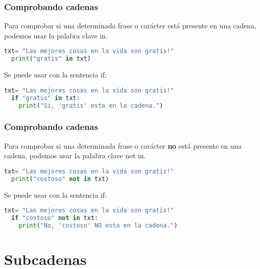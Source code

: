 \begin{frame}[fragile]
  \frametitle{Comprobando cadenas}

  Para comprobar si una determinada frase o carácter está presente
  en una cadena, podemos usar la palabra clave
  \textcolor{codeKeyword}{in}.

  \begin{lstlisting}[language=Python]
  txt= "Las mejores cosas en la vida son gratis!"
  print("gratis" in txt)
  \end{lstlisting}

  \pausa
  Se puede usar con la sentencia \textcolor{codeKeyword}{if}:

  \begin{lstlisting}[language=Python]
  txt= "Las mejores cosas en la vida son gratis!"
  if "gratis" in txt:
    print("Si, 'gratis' esta en la cadena.")
  \end{lstlisting}
\end{frame}

\begin{frame}[fragile]
  \frametitle{Comprobando cadenas}

  Para comprobar si una determinada frase o carácter \textbf{no} 
  está presente en una cadena, podemos usar la palabra clave
  \textcolor{codeKeyword}{not in}.

  \begin{lstlisting}[language=Python]
  txt= "Las mejores cosas en la vida son gratis!"
  print("costoso" not in txt)
  \end{lstlisting}

  \pausa
  Se puede usar con la sentencia \textcolor{codeKeyword}{if}:

  \begin{lstlisting}[language=Python]
  txt= "Las mejores cosas en la vida son gratis!"
  if "costoso" not in txt:
    print("No, 'costoso' NO esta en la cadena.")
  \end{lstlisting}
\end{frame}


\section{Subcadenas}

